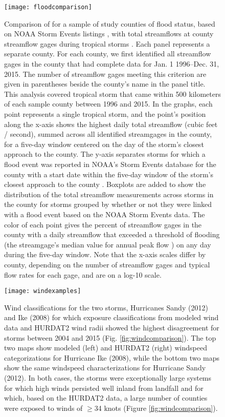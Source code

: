 \documentclass[11pt, titlepage]{article}
\begin{document}
\begin{figure}[tbhp!]
\centering
\texttt{[image: floodcomparison]}
\caption{Comparison of for a sample of study counties of flood status, based on NOAA Storm Events listings \citep{stormevents, noaastormevents}, with total streamflows at county streamflow gages during tropical storms \citep{usgsgages, countyfloods, dataRetrieval}. Each panel represents a separate county. For each county, we first identified all streamflow gages in the county that had complete data for Jan. 1 1996--Dec. 31, 2015. The number of streamflow gages meeting this criterion are given in parentheses beside the county's name in the panel title. This analysis covered tropical storm that came within 500 kilometers of each sample county between 1996 and 2015. In the graphs, each point represents a single tropical storm, and the point's position along the x-axis shows the highest daily total streamflow (cubic feet / second), summed across all identified streamgages in the county, for a five-day window centered on the day of the storm's closest approach to the county. The y-axis separates storms for which a flood event was reported in NOAA's Storm Events database for the county with a start date within the five-day window of the storm's closest approach to the county \citep{stormevents, noaastormevents}. Boxplots are added to show the distribution of the total streamflow measurements across storms in the county for storms grouped by whether or not they were linked with a flood event based on the NOAA Storm Events data. The color of each point gives the percent of streamflow gages in the county with a daily streamflow that exceeded a threshold of flooding (the streamgage's median value for annual peak flow \citep{countyfloods}) on any day during the five-day window.  Note that the x-axis scales differ by county, depending on the number of streamflow gages and typical flow rates for each gage, and are on a log-10 scale.}
\label{fig:floodcomparison}
\end{figure}

\begin{figure}[tbhp!]
\centering
\texttt{[image: windexamples]}
\caption{Wind classifications for the two storms, Hurricanes Sandy (2012) and Ike (2008) for which exposure classifications from modeled wind data \citep{stormwindmodel} and HURDAT2 wind radii \citep{demuth2006improvement} showed the highest disagreement for storms between 2004 and 2015 (Fig. \ref{fig:windcomparison}). The top two maps show modeled (left) and HURDAT2 (right) windspeed categorizations for Hurricane Ike (2008), while the bottom two maps show the same windspeed characterizations for Hurricane Sandy (2012). In both cases, the storms were exceptionally large systems for which high winds persisted well inland from landfall and for which, based on the HURDAT2 data, a large number of counties were exposed to winds of $\ge$34 knots (Figure \ref{fig:windcomparison}).}
\label{fig:windexamples}
\end{figure}
\end{document}
